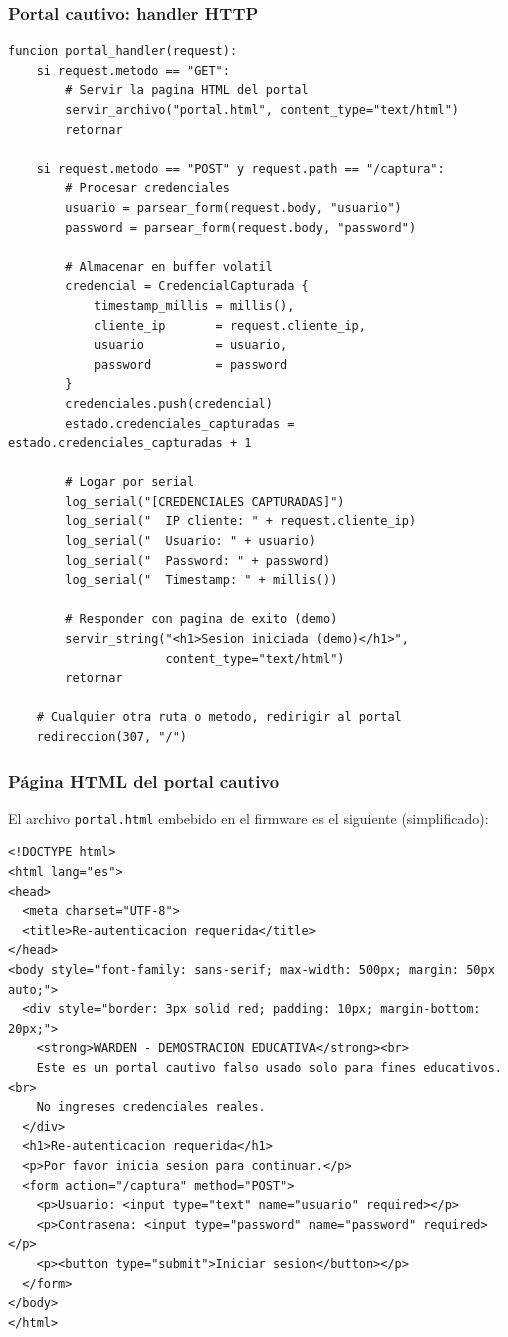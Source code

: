 \documentclass[11pt,a4paper]{article}
\begin{document}
\subsubsection{Portal cautivo: handler HTTP}

\begin{lstlisting}
funcion portal_handler(request):
    si request.metodo == "GET":
        # Servir la pagina HTML del portal
        servir_archivo("portal.html", content_type="text/html")
        retornar

    si request.metodo == "POST" y request.path == "/captura":
        # Procesar credenciales
        usuario = parsear_form(request.body, "usuario")
        password = parsear_form(request.body, "password")

        # Almacenar en buffer volatil
        credencial = CredencialCapturada {
            timestamp_millis = millis(),
            cliente_ip       = request.cliente_ip,
            usuario          = usuario,
            password         = password
        }
        credenciales.push(credencial)
        estado.credenciales_capturadas = estado.credenciales_capturadas + 1

        # Logar por serial
        log_serial("[CREDENCIALES CAPTURADAS]")
        log_serial("  IP cliente: " + request.cliente_ip)
        log_serial("  Usuario: " + usuario)
        log_serial("  Password: " + password)
        log_serial("  Timestamp: " + millis())

        # Responder con pagina de exito (demo)
        servir_string("<h1>Sesion iniciada (demo)</h1>",
                      content_type="text/html")
        retornar

    # Cualquier otra ruta o metodo, redirigir al portal
    redireccion(307, "/")
\end{lstlisting}

\subsubsection{Página HTML del portal cautivo}
El archivo \texttt{portal.html} embebido en el firmware es el siguiente
(simplificado):

\begin{lstlisting}
<!DOCTYPE html>
<html lang="es">
<head>
  <meta charset="UTF-8">
  <title>Re-autenticacion requerida</title>
</head>
<body style="font-family: sans-serif; max-width: 500px; margin: 50px auto;">
  <div style="border: 3px solid red; padding: 10px; margin-bottom: 20px;">
    <strong>WARDEN - DEMOSTRACION EDUCATIVA</strong><br>
    Este es un portal cautivo falso usado solo para fines educativos.<br>
    No ingreses credenciales reales.
  </div>
  <h1>Re-autenticacion requerida</h1>
  <p>Por favor inicia sesion para continuar.</p>
  <form action="/captura" method="POST">
    <p>Usuario: <input type="text" name="usuario" required></p>
    <p>Contrasena: <input type="password" name="password" required></p>
    <p><button type="submit">Iniciar sesion</button></p>
  </form>
</body>
</html>
\end{lstlisting}
\end{document}

